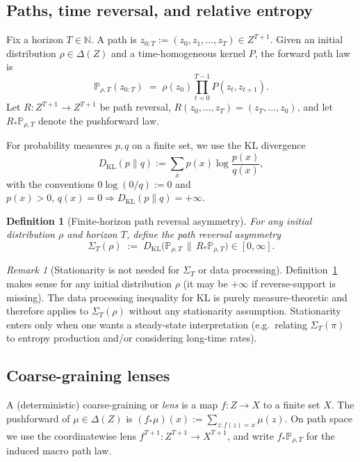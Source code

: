 \documentclass[11pt]{article}
\newtheorem{definition}{Definition}
\theoremstyle{remark}
\newtheorem{remark}{Remark}
\begin{document}
\subsection{Paths, time reversal, and relative entropy}

Fix a horizon $T \in \mathbb{N}$. A path is $z_{0:T} := (z_0,z_1,\dots,z_T)\in Z^{T+1}$.
Given an initial distribution $\rho\in\Delta(Z)$ and a time-homogeneous kernel $P$, the forward path law is
\[
\mathbb{P}_{\rho,T}(z_{0:T}) \;=\; \rho(z_0)\prod_{t=0}^{T-1} P(z_t,z_{t+1}).
\]
Let $R:Z^{T+1}\to Z^{T+1}$ be path reversal, $R(z_0,\dots,z_T)=(z_T,\dots,z_0)$, and let $R_*\mathbb{P}_{\rho,T}$ denote the pushforward law.

For probability measures $p,q$ on a finite set, we use the KL divergence
\[
D_{\mathrm{KL}}(p\|q) := \sum_x p(x)\log\frac{p(x)}{q(x)},
\]
with the conventions $0\log(0/q):=0$ and $p(x)>0,\,q(x)=0 \Rightarrow D_{\mathrm{KL}}(p\|q)=+\infty$.

\begin{definition}[Finite-horizon path reversal asymmetry]\label{def:path-asymmetry}
For any initial distribution $\rho$ and horizon $T$, define the path reversal asymmetry
\[
\Sigma_T(\rho) \;:=\; D_{\mathrm{KL}}\!\big(\mathbb{P}_{\rho,T}\,\|\,R_*\mathbb{P}_{\rho,T}\big)\in[0,\infty].
\]
\end{definition}

\begin{remark}[Stationarity is not needed for $\Sigma_T$ or data processing]
Definition~\ref{def:path-asymmetry} makes sense for any initial distribution $\rho$ (it may be $+\infty$ if reverse-support is missing).
The data processing inequality for KL is purely measure-theoretic and therefore applies to $\Sigma_T(\rho)$ without any stationarity assumption.
Stationarity enters only when one wants a steady-state interpretation (e.g.\ relating $\Sigma_T(\pi)$ to entropy production and/or considering long-time rates).
\end{remark}

\subsection{Coarse-graining lenses}

A (deterministic) coarse-graining or \emph{lens} is a map $f:Z\to X$ to a finite set $X$.
The pushforward of $\mu\in\Delta(Z)$ is $(f_*\mu)(x):=\sum_{z:f(z)=x}\mu(z)$.
On path space we use the coordinatewise lens $f^{T+1}:Z^{T+1}\to X^{T+1}$, and write $f_*\mathbb{P}_{\rho,T}$ for the induced macro path law.
\end{document}

